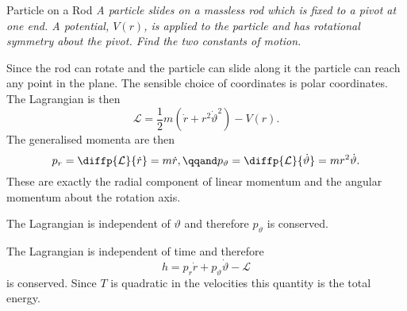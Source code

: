 \documentclass[fleqn]{NotesClass}
\newcommand*{\lagrangian}{\mathcal{L}}
\begin{document}
    \begin{exm}{Particle on a Rod}{}
        \textit{A particle slides on a massless rod which is fixed to a pivot at one end.
        A potential, \(V(r)\), is applied to the particle and has rotational symmetry about the pivot.
        Find the two constants of motion.}
    
        Since the rod can rotate and the particle can slide along it the particle can reach any point in the plane.
        The sensible choice of coordinates is polar coordinates.
        The Lagrangian is then
        \begin{equation}
            \lagrangian = \frac{1}{2}m(\dot{r} + r^2\dot{\vartheta}^2) - V(r).
        \end{equation}
        The generalised momenta are then
        \begin{equation}
            p_r = \diffp{\lagrangian}{\dot{r}} = m\dot{r}, \qqand p_\vartheta = \diffp{\lagrangian}{\dot{\vartheta}} = mr^2\dot{\vartheta}.
        \end{equation}
        These are exactly the radial component of linear momentum and the angular momentum about the rotation axis.
        
        The Lagrangian is independent of \(\vartheta\) and therefore \(p_{\vartheta}\) is conserved.
        
        The Lagrangian is independent of time and therefore
        \begin{equation}
            h = p_r\dot{r} + p_{\vartheta}\dot{\vartheta} - \lagrangian
        \end{equation}
        is conserved.
        Since \(T\) is quadratic in the velocities this quantity is the total energy.
    \end{exm}
    
\end{document}
